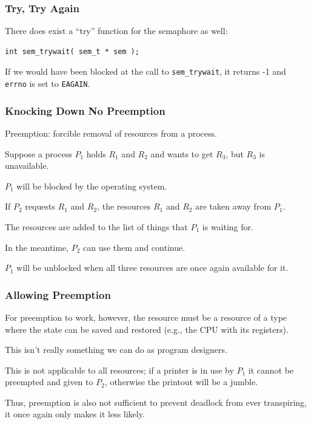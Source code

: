 \begin{frame}[fragile]
\frametitle{Try, Try Again}

There does exist a ``try'' function for the semaphore as well:

\begin{lstlisting}
int sem_trywait( sem_t * sem );
\end{lstlisting}

If we would have been blocked at the call to \texttt{sem\_trywait}, it returns -1 and \texttt{errno} is set to \texttt{EAGAIN}.

\end{frame}



\begin{frame}
	\frametitle{Knocking Down No Preemption}

	Preemption: forcible removal of resources from a process.

	Suppose a process $P_{1}$ holds $R_{1}$ and $R_{2}$ and wants to get $R_{3}$, but $R_{3}$ is unavailable.

	$P_{1}$ will be blocked by the operating system.

	If $P_{2}$ requests $R_{1}$ and $R_{2}$, the resources $R_{1}$ and $R_{2}$ are taken away from $P_{1}$.

	The resources are added to the list of things that $P_{1}$ is waiting for.

	In the meantime, $P_{2}$ can use them and continue.

	$P_{1}$ will be unblocked when all three resources are once again available for it.

\end{frame}


\begin{frame}
	\frametitle{Allowing Preemption}

	For preemption to work, however, the resource must be a resource of a type where the state can be saved and restored (e.g., the CPU with its registers).

	This isn't really something we can do as program designers.

	This is not applicable to all resources; if a printer is in use by $P_{1}$ it cannot be preempted and given to $P_{2}$, otherwise the printout will be a jumble.

	Thus, preemption is also not sufficient to prevent deadlock from ever transpiring, it once again only makes it less likely.



\end{frame}




